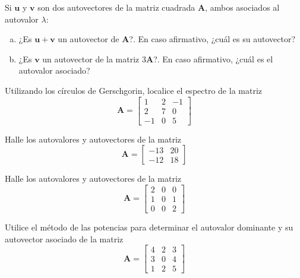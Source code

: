 \documentclass[11pt]{article}
\begin{document}
\begin{question} %
    Si $\bm{u}$ y $\bm{v}$ son dos autovectores de la matriz cuadrada $\bm{A}$, ambos asociados al autovalor $\lambda$:
    \begin{enumerate}[a)]
        \item ¿Es $\bm{u} + \bm{v}$ un autovector de $\bm{A}$?. En caso afirmativo, ¿cuál es su autovector?
        \item ¿Es $\bm{v}$ un autovector de la matriz $3 \bm{A}$?. En caso afirmativo, ¿cuál es el autovalor asociado?
    \end{enumerate}
\end{question}

\begin{question} %
    Utilizando los círculos de Gerschgorin, localice el espectro de la matriz
    \[ \bm{A} = 
        \begin{bmatrix}
            1 & 2 & -1 \\
            2 & 7 & 0 \\
            -1 & 0 & 5
        \end{bmatrix} \]
\end{question}

\begin{question} %
    Halle los autovalores y autovectores de la matriz
    \[ \bm{A} = \begin{bmatrix} -13 & 20 \\ -12 & 18 \end{bmatrix} \]
\end{question}


\begin{question} %
    Halle los autovalores y autovectores de la matriz
    \[ \bm{A} = \begin{bmatrix} 2 & 0 & 0 \\ 1 & 0 & 1 \\ 0 & 0 & 2 \end{bmatrix} \]
\end{question}

\begin{question} 
Utilice el método de las potencias para determinar el autovalor dominante y su autovector asociado de la matriz
\[ \bm{A} = \begin{bmatrix} 4 & 2 & 3 \\ 3 & 0 & 4 \\ 1 & 2 & 5 \end{bmatrix} \]
\end{question}
\end{document}
